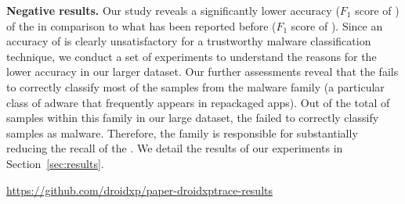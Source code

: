 {\bf Negative results.} Our study reveals a significantly lower
accuracy ($F_1$ score of \fscore) of the \mas in comparison to what has been reported before ($F_1$ score of \fscoreSmall). 
Since an accuracy of \fscore is clearly unsatisfactory for a trustworthy malware classification technique, we conduct a set of experiments 
to understand the reasons for the lower accuracy in our larger dataset.
Our further assessments reveal that the \mas fails to correctly classify most of the samples from
the \gps malware family (a particular class of adware that frequently appears in repackaged apps). 
Out of the total of \appsGps samples within this family in our large dataset, the \mas failed to correctly classify \appsGpsFN samples as malware.
Therefore, the \gps family is responsible for substantially reducing the recall of the \mas. We detail the results of our experiments in Section~\ref{sec:results}. %


\begin{small}
  \begin{center}
    \url{https://github.com/droidxp/paper-droidxptrace-results}
  \end{center}
\end{small}

